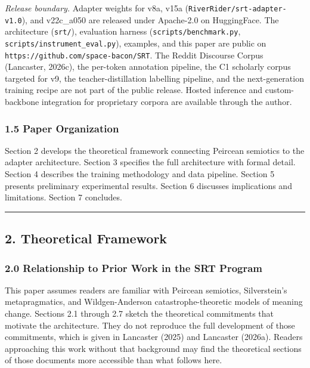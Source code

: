 \documentclass[
  11pt]{article}
\begin{document}
\emph{Release boundary.} Adapter weights for v8a, v15a
(\texttt{RiverRider/srt-adapter-v1.0}), and v22c\_a050 are released
under Apache-2.0 on HuggingFace. The architecture (\texttt{srt/}),
evaluation harness (\texttt{scripts/benchmark.py},
\texttt{scripts/instrument\_eval.py}), examples, and this paper are
public on \texttt{https://github.com/space-bacon/SRT}. The Reddit
Discourse Corpus (Lancaster, 2026c), the per-token annotation pipeline,
the C1 scholarly corpus targeted for v9, the teacher-distillation
labelling pipeline, and the next-generation training recipe are not part
of the public release. Hosted inference and custom-backbone integration
for proprietary corpora are available through the author.

\subsubsection{1.5 Paper Organization}\label{paper-organization}

Section 2 develops the theoretical framework connecting Peircean
semiotics to the adapter architecture. Section 3 specifies the full
architecture with formal detail. Section 4 describes the training
methodology and data pipeline. Section 5 presents preliminary
experimental results. Section 6 discusses implications and limitations.
Section 7 concludes.

\begin{center}\rule{0.5\linewidth}{0.5pt}\end{center}

\subsection{2. Theoretical Framework}\label{theoretical-framework}

\subsubsection{2.0 Relationship to Prior Work in the SRT
Program}\label{relationship-to-prior-work-in-the-srt-program}

This paper assumes readers are familiar with Peircean semiotics,
Silverstein's metapragmatics, and Wildgen-Anderson catastrophe-theoretic
models of meaning change. Sections 2.1 through 2.7 sketch the
theoretical commitments that motivate the architecture. They do not
reproduce the full development of those commitments, which is given in
Lancaster (2025) and Lancaster (2026a). Readers approaching this work
without that background may find the theoretical sections of those
documents more accessible than what follows here.
\end{document}
